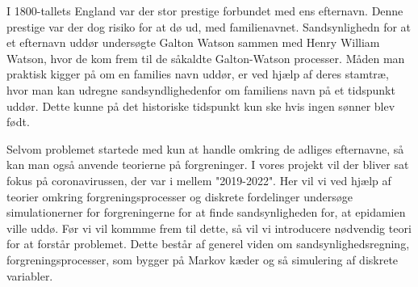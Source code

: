 I 1800-tallets England var der stor prestige forbundet med ens efternavn. Denne prestige var der dog risiko for at dø ud, med familienavnet. Sandsynlighedn for at et efternavn uddør undersøgte Galton Watson sammen med Henry William Watson, hvor de kom frem til de såkaldte Galton-Watson processer. Måden man praktisk kigger på om en families navn uddør, er ved hjælp af deres stamtræ, hvor man kan udregne sandsyndlighedenfor om familiens navn på et tidspunkt uddør. Dette kunne på det historiske tidspunkt kun ske hvis ingen sønner blev født.

\quad Selvom problemet startede med kun at handle omkring de adliges efternavne, så kan man også anvende teorierne på forgreninger. I vores projekt vil der bliver sat fokus på coronavirussen, der var i mellem "2019-2022". Her vil vi ved hjælp af teorier omkring forgreningsprocesser og diskrete fordelinger undersøge simulationerner for forgreningerne for at finde sandsynligheden for, at epidamien ville uddø. Før vi vil kommme frem til dette, så vil vi introducere  nødvendig teori for at forstår problemet. Dette består af generel viden om sandsynlighedsregning, forgreningsprocesser, som bygger på Markov kæder og så simulering af diskrete variabler. 
